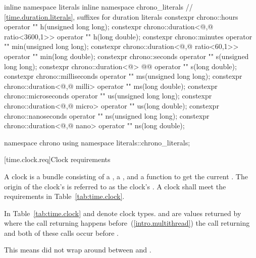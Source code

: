 \begin{codeblock}
{  inline namespace literals {
    inline namespace chrono_literals {
      // \ref{time.duration.literals}, suffixes for duration literals
      constexpr chrono::hours                                operator "" h(unsigned long long);
      constexpr chrono::duration<@\unspec,@ ratio<3600,1>> operator "" h(long double);
      constexpr chrono::minutes                              operator "" min(unsigned long long);
      constexpr chrono::duration<@\unspec,@ ratio<60,1>>   operator "" min(long double);
      constexpr chrono::seconds                              operator "" s(unsigned long long);
      constexpr chrono::duration<@\unspec@> @\itcorr[-1]@               operator "" s(long double);
      constexpr chrono::milliseconds                         operator "" ms(unsigned long long);
      constexpr chrono::duration<@\unspec,@ milli>          operator "" ms(long double);
      constexpr chrono::microseconds                         operator "" us(unsigned long long);
      constexpr chrono::duration<@\unspec,@ micro>         operator "" us(long double);
      constexpr chrono::nanoseconds                          operator "" ns(unsigned long long);
      constexpr chrono::duration<@\unspec,@ nano>          operator "" ns(long double);
    }
  }

  namespace chrono {
    using namespace literals::chrono_literals;
  }
}
\end{codeblock}

[time.clock.req]{Clock requirements}

\pnum
A clock is a bundle consisting of a , a
, and a function  to get the current .
The origin of the clock's  is referred to as the clock's .
 A clock shall meet the requirements in Table~\ref{tab:time.clock}.

\pnum
In Table~\ref{tab:time.clock}  and  denote clock types.  and
 are values returned by  where the call returning  happens
before~(\ref{intro.multithread}) the call returning  and both of these calls
occur
before .
\begin{note} This means  did not wrap around between  and
. \end{note}

